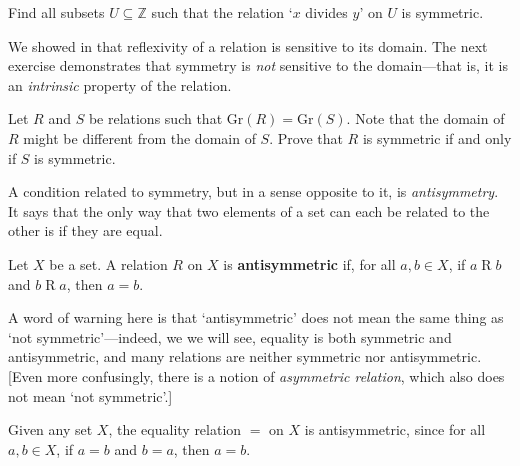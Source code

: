 \begin{exercise}
Find all subsets $U \subseteq \mathbb{Z}$ such that the relation `$x$ divides $y$' on $U$ is symmetric.
\end{exercise}

We showed in  that reflexivity of a relation is sensitive to its domain. The next exercise demonstrates that symmetry is \textit{not} sensitive to the domain---that is, it is an \textit{intrinsic} property of the relation.

\begin{exercise}
\label{exSymmetryNotSensitiveToDomainOfRelation}
Let $R$ and $S$ be relations such that $\mathrm{Gr}(R) = \mathrm{Gr}(S)$. Note that the domain of $R$ might be different from the domain of $S$. Prove that $R$ is symmetric if and only if $S$ is symmetric.
\end{exercise}

A condition related to symmetry, but in a sense opposite to it, is \textit{antisymmetry}. It says that the only way that two elements of a set can each be related to the other is if they are equal.

\begin{definition}
Let $X$ be a set. A relation $R$ on $X$ is \textbf{antisymmetric} if, for all $a,b \in X$, if $a \mathrel{R} b$ and $b \mathrel{R} a$, then $a=b$.
\end{definition}

\begin{center}
\end{center}

A word of warning here is that `antisymmetric' does not mean the same thing as `not symmetric'---indeed, we we will see, equality is both symmetric and antisymmetric, and many relations are neither symmetric nor antisymmetric. [Even more confusingly, there is a notion of \textit{asymmetric relation}, which also does not mean `not symmetric'.]

\begin{example}
Given any set $X$, the equality relation $=$ on $X$ is antisymmetric, since for all $a,b \in X$, if $a=b$ and $b=a$, then $a=b$.
\end{example}

